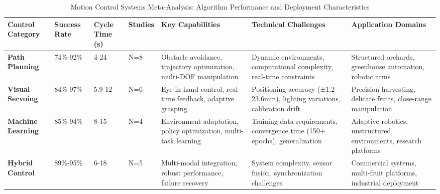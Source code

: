\begin{table*}[htbp]
\centering
\footnotesize
\caption{Motion Control Systems Meta-Analysis: Algorithm Performance and Deployment Characteristics}
\label{tab:motion_control_meta_analysis}
\begin{tabular}{@{}p{}p{}p{}p{}p{}p{}p{}@{}}
\toprule
\textbf{Control Category} & \textbf{Success Rate} & \textbf{Cycle Time (s)} & \textbf{Studies} & \textbf{Key Capabilities} & \textbf{Technical Challenges} & \textbf{Application Domains} \\
\midrule

\textbf{Path Planning} & 
74\%-92\% & 
4-24 & 
N=8 & 
Obstacle avoidance, trajectory optimization, multi-DOF manipulation \cite{bac2014harvesting,lehnert2016sweet} & 
Dynamic environments, computational complexity, real-time constraints \cite{kang2020real} & 
Structured orchards, greenhouse automation, robotic arms \\
\midrule

\textbf{Visual Servoing} & 
84\%-97\% & 
5.9-12 & 
N=6 & 
Eye-in-hand control, real-time feedback, adaptive grasping \cite{yu2019fruit,ge2019fruit} & 
Positioning accuracy (±1.2-23.6mm), lighting variations, calibration drift \cite{jun2021towards} & 
Precision harvesting, delicate fruits, close-range manipulation \\
\midrule

\textbf{Machine Learning} & 
85\%-94\% & 
8-15 & 
N=4 & 
Environment adaptation, policy optimization, multi-task learning \cite{kang2020real,li2021real} & 
Training data requirements, convergence time (150+ epochs), generalization \cite{ZHOU2024110} & 
Adaptive robotics, unstructured environments, research platforms \\
\midrule

\textbf{Hybrid Control} & 
89\%-95\% & 
6-18 & 
N=5 & 
Multi-modal integration, robust performance, failure recovery \cite{luo2018vision,wang2017robust} & 
System complexity, sensor fusion, synchronization challenges \cite{mendes2016vine} & 
Commercial systems, multi-fruit platforms, industrial deployment \\

\bottomrule
\end{tabular}
\end{table*}